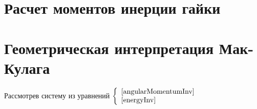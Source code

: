 \documentclass{article}
\begin{document}
\section{Расчет моментов инерции гайки}
\section{Геометрическая интерпретация Мак-Кулага}
Рассмотрев систему из уравнений
\begin{math}
\left\{
\begin{array}{l}
\ref{angularMomentumInv}\\
\ref{energyInv}
\end{array}
\right.
\end{math}
\end{document}
